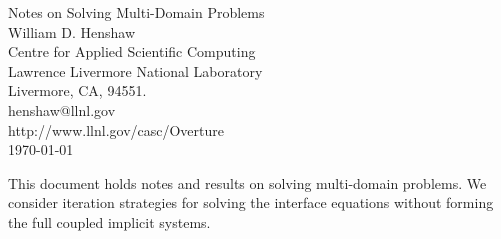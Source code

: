 \documentclass[11pt]{article}
\begin{document}


\def\comma  {~~~,~~}
\newcommand{\uvd}{\mathbf{U}}
\def\ud     {{    U}}
\def\pd     {{    P}}
\def\calo{{\cal O}}

\newcommand{\mbar}{\bar{m}}
\newcommand{\Rbar}{\bar{R}}
\newcommand{\Ru}{R_u}         %
\newcommand{\Div}{\grad\cdot}
\newcommand{\tauv}{\boldsymbol{\tau}}
\newcommand{\thetav}{\boldsymbol{\theta}}

\newcommand{\Omegav}{\boldsymbol{\Omega}}
\newcommand{\omegav}{\boldsymbol{\omega}}
\newcommand{\sigmav}{\boldsymbol{\sigma}}
\newcommand{\cm}{{\rm cm}}
\newcommand{\Jc}{{\mathcal J}}

\newcommand{\sumi}{\sum_{i=1}^n}
\newcommand{\dt}{{\Delta t}}

\def\ff {\tt} %



\newcommand{\bogus}[1]{}  %

\vspace{5\baselineskip}
\begin{flushleft}
{\Large
Notes on Solving Multi-Domain Problems \\
}
\vspace{2\baselineskip}
William D. Henshaw  \\
Centre for Applied Scientific Computing  \\
Lawrence Livermore National Laboratory      \\
Livermore, CA, 94551.  \\
henshaw@llnl.gov \\
http://www.llnl.gov/casc/Overture\\
\vspace{\baselineskip}
\today\\
\vspace{\baselineskip}

\vspace{4\baselineskip}


This document holds notes and results on solving multi-domain problems.
We consider iteration strategies for solving the interface equations without
forming the full coupled implicit systems. 

\end{flushleft}
\end{document}
